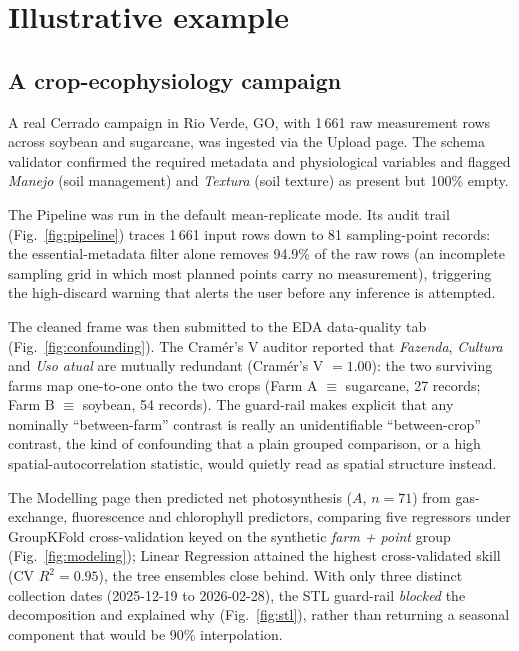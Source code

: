 \documentclass[preprint,12pt,a4paper]{elsarticle}
\begin{document}
\section{Illustrative example}\label{sec:examples}

\subsection{A crop-ecophysiology campaign}\label{sec:ex-physio}

A real Cerrado campaign in Rio Verde, GO, with 1\,661 raw measurement rows across soybean and sugarcane, was ingested via the Upload page. The schema validator confirmed the required metadata and physiological variables and flagged \emph{Manejo} (soil management) and \emph{Textura} (soil texture) as present but 100\% empty.

The Pipeline was run in the default mean-replicate mode. Its audit trail (Fig.~\ref{fig:pipeline}) traces 1\,661 input rows down to 81 sampling-point records: the essential-metadata filter alone removes 94.9\% of the raw rows (an incomplete sampling grid in which most planned points carry no measurement), triggering the high-discard warning that alerts the user before any inference is attempted.

The cleaned frame was then submitted to the EDA data-quality tab (Fig.~\ref{fig:confounding}). The Cram\'er's V auditor reported that \emph{Fazenda}, \emph{Cultura} and \emph{Uso atual} are mutually redundant (Cram\'er's V $=1.00$): the two surviving farms map one-to-one onto the two crops (Farm A $\equiv$ sugarcane, 27 records; Farm B $\equiv$ soybean, 54 records). The guard-rail makes explicit that any nominally ``between-farm'' contrast is really an unidentifiable ``between-crop'' contrast, the kind of confounding that a plain grouped comparison, or a high spatial-autocorrelation statistic, would quietly read as spatial structure instead.

The Modelling page then predicted net photosynthesis ($A$, $n=71$) from gas-exchange, fluorescence and chlorophyll predictors, comparing five regressors under GroupKFold cross-validation keyed on the synthetic \emph{farm + point} group (Fig.~\ref{fig:modeling}); Linear Regression attained the highest cross-validated skill (CV $R^2 = 0.95$), the tree ensembles close behind. With only three distinct collection dates (2025-12-19 to 2026-02-28), the STL guard-rail \emph{blocked} the decomposition and explained why (Fig.~\ref{fig:stl}), rather than returning a seasonal component that would be 90\% interpolation.
\end{document}
